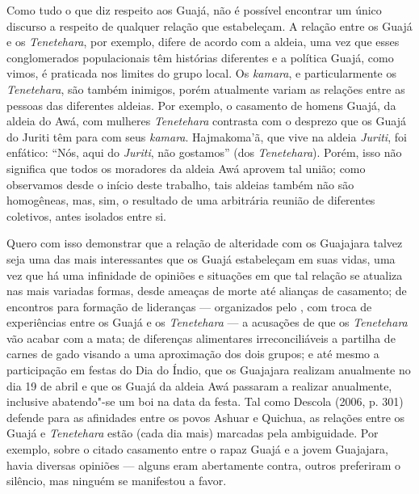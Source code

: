 Como tudo o que diz respeito aos Guajá, não é possível encontrar um
único discurso a respeito de qualquer relação que estabeleçam. A relação
entre os Guajá e os \emph{Tenetehara}, por exemplo, difere de acordo com
a aldeia, uma vez que esses conglomerados populacionais têm histórias
diferentes e a política Guajá, como vimos, é praticada nos limites do
grupo local. Os \emph{kamara}, e particularmente os \emph{Tenetehara},
são também inimigos, porém atualmente variam as relações entre as
pessoas das diferentes aldeias. Por exemplo, o casamento de homens
Guajá, da aldeia do  Awá, com mulheres \emph{Tenetehara}
contrasta com o desprezo que os Guajá do Juriti têm para com seus
\emph{kamara}. Hajmakoma'ã, que vive na aldeia \emph{Juriti}, foi
enfático: ``Nós, aqui do \emph{Juriti}, não gostamos'' (dos
\emph{Tenetehara}). Porém, isso não significa que todos os moradores da
aldeia Awá aprovem tal união; como observamos desde o início deste
trabalho, tais aldeias também não são homogêneas, mas, sim, o resultado
de uma arbitrária reunião de diferentes coletivos, antes isolados entre
si.

Quero com isso demonstrar que a relação de alteridade com os Guajajara
talvez seja uma das mais interessantes que os Guajá estabeleçam em suas
vidas, uma vez que há uma infinidade de opiniões e situações em que tal
relação se atualiza nas mais variadas formas, desde ameaças de morte até
alianças de casamento; de encontros para formação de lideranças ---
organizados pelo , com troca de experiências entre os Guajá e os
\emph{Tenetehara} --- a acusações de que os \emph{Tenetehara} vão acabar
com a mata; de diferenças alimentares irreconciliáveis a partilha de
carnes de gado visando a uma aproximação dos dois grupos; e até mesmo a
participação em festas do Dia do Índio, que os Guajajara realizam
anualmente no dia 19 de abril e que os Guajá da aldeia Awá passaram a
realizar anualmente, inclusive abatendo"-se um boi na data da festa. Tal
como Descola (2006, p. 301) defende para as afinidades entre os povos
Ashuar e Quichua, as relações entre os Guajá e \emph{Tenetehara} estão
(cada dia mais) marcadas pela ambiguidade. Por exemplo, sobre o citado
casamento entre o rapaz Guajá e a jovem Guajajara, havia diversas
opiniões --- alguns eram abertamente contra, outros preferiram o silêncio,
mas ninguém se manifestou a favor.

